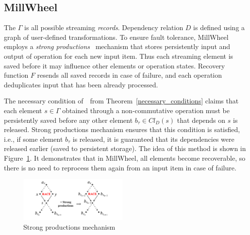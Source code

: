 \label{fs-eo-impl}



\subsection{MillWheel}

 The $\Gamma$ is all possible streaming {\em records}. Dependency relation $D$ is defined using a graph of user-defined transformations. 
 To ensure fault tolerance,   MillWheel employs a {\em strong productions}~\cite{Akidau:2013:MFS:2536222.2536229}   mechanism that stores persistently input and output of operation for each new input item.
 Thus each streaming element is saved before it may influence other elements or operation states. 
 Recovery function $F$ resends all saved records in case of failure, and each operation deduplicates input that has been already processed.

The necessary condition of~\eo\ from Theorem~\ref{necessary_conditions} claims that each element $s \in \Gamma$ obtained through a non-commutative operation must be persistently saved before any other element $b_{\tau} \in Cl_D(s)$ that depends on $s$ is released. Strong productions mechanism ensures that this condition is satisfied, i.e., if some element $b_\tau$ is released, it is guaranteed that its dependencies were released earlier (saved to persistent storage). The idea of this method is shown in Figure~\ref{millwheel}. It demonstrates that in MillWheel, all elements become recoverable, so there is no need to reprocess them again from an input item in case of failure. 

\begin{figure}[htbp]
  \centering
  \includegraphics[width=0.48\textwidth]{pics/millwheel}
  \caption{Strong productions mechanism}
  \label{millwheel}
\end{figure}

